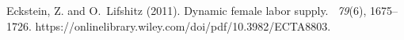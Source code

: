 \documentclass[fleqn,12pt]{article}
\renewenvironment{thebibliography}[1]{\begin{oldthebibliography}{#1}\setlength{\itemsep}{4.2pt}}{\end{oldthebibliography}}
\theoremstyle{plain}
\theoremstyle{definition}
\begin{document}
\begin{thebibliography}{}

Eckstein, Z. and O.~Lifshitz (2011).
\newblock Dynamic female labor supply.
~{\em 79\/}(6), 1675--1726.
\newblock https://onlinelibrary.wiley.com/doi/pdf/10.3982/ECTA8803.

\end{thebibliography}
\end{document}
